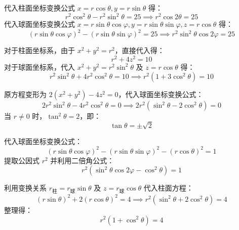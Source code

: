 \begin{solution}
    代入柱面坐标变换公式 $x = r \cos \theta, y = r \sin \theta$ 得：
    \begin{equation*}
        r^2 \cos^2 \theta - r^2 \sin^2 \theta = 25 \implies \boxed{r^2 \cos 2\theta = 25}
    \end{equation*}
    代入球面坐标变换公式 $x = r \sin \theta \cos \varphi, y = r \sin \theta \sin \varphi, z = r \cos \theta$ 得：
    \begin{equation*}
        (r \sin \theta \cos \varphi)^2 - (r \sin \theta \sin \varphi)^2 = 25 \implies \boxed{r^2 \sin^2 \theta \cos 2\varphi = 25}
    \end{equation*}

    对于柱面坐标系，由于 $x^2 + y^2 = r^2$，直接代入得：
    \begin{equation*}
        \boxed{r^2 + 4z^2 = 10}
    \end{equation*}
    对于球面坐标系，代入 $x^2 + y^2 = r^2 \sin^2 \theta$ 及 $z = r \cos \theta$ 得：
    \begin{equation*}
        r^2 \sin^2 \theta + 4r^2 \cos^2 \theta = 10 \implies \boxed{r^2 (1 + 3\cos^2 \theta) = 10}
    \end{equation*}

    原方程变形为 $2(x^2 + y^2) - 4z^2 = 0$，代入球面坐标变换公式：
    \begin{equation*}
        2r^2 \sin^2 \theta - 4r^2 \cos^2 \theta = 0 \implies 2r^2 (\sin^2 \theta - 2\cos^2 \theta) = 0
    \end{equation*}
    当 $r \neq 0$ 时，$\tan^2 \theta = 2$，即：
    \begin{equation*}
        \boxed{\tan \theta = \pm \sqrt{2}}
    \end{equation*}

    代入球面坐标变换公式：
    \begin{equation*}
        (r \sin \theta \cos \varphi)^2 - (r \sin \theta \sin \varphi)^2 - (r \cos \theta)^2 = 1
    \end{equation*}
    提取公因式 $r^2$ 并利用二倍角公式：
    \begin{equation*}
        \boxed{r^2 (\sin^2 \theta \cos 2\varphi - \cos^2 \theta) = 1}
    \end{equation*}

    利用变换关系 $r_{\text{柱}} = r_{\text{球}} \sin \theta$ 及 $z = r_{\text{球}} \cos \theta$ 代入柱面方程：
    \begin{equation*}
        (r \sin \theta)^2 + 2(r \cos \theta)^2 = 4 \implies r^2 (\sin^2 \theta + 2\cos^2 \theta) = 4
    \end{equation*}
    整理得：
    \begin{equation*}
        \boxed{r^2 (1 + \cos^2 \theta) = 4}
    \end{equation*}


\end{solution}
